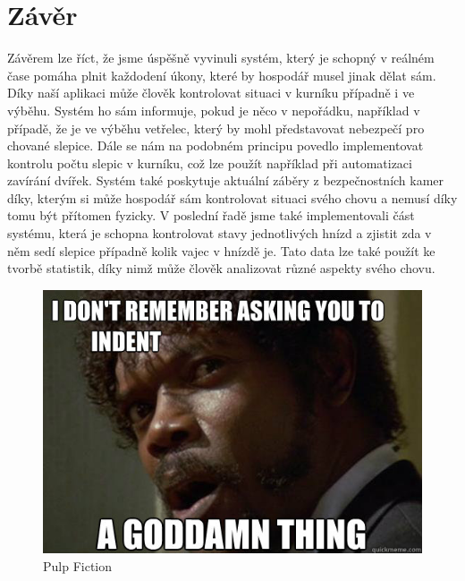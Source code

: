 ﻿\newpage
\chapter{Závěr}
Závěrem lze říct, že jsme úspěšně vyvinuli systém, který je schopný v reálném čase pomáha plnit každodení úkony, které by hospodář musel jinak dělat sám. Díky naší aplikaci může člověk kontrolovat situaci v kurníku případně i ve výběhu. Systém ho sám informuje, pokud je něco v nepořádku, například v případě, že je ve výběhu vetřelec, který by mohl představovat nebezpečí pro chované slepice. Dále se nám na podobném principu povedlo implementovat kontrolu počtu slepic v kurníku, což lze použít například při automatizaci zavírání dvířek. Systém také poskytuje aktuální záběry z bezpečnostních kamer díky, kterým si může hospodář sám kontrolovat situaci svého chovu a nemusí díky tomu být přítomen fyzicky. V poslední řadě jsme také implementovali část systému, která je schopna kontrolovat stavy jednotlivých hnízd a zjistit zda v něm sedí slepice případně kolik vajec v hnízdě je. Tato data lze také použít ke tvorbě statistik, díky nimž může člověk analizovat různé aspekty svého chovu.

\begin{figure}[h]
    \centering
    \includegraphics[width=\textwidth]{img/pulp}
    \caption{Pulp Fiction}
    \label{fig:pulp-fiction}
\end{figure}


